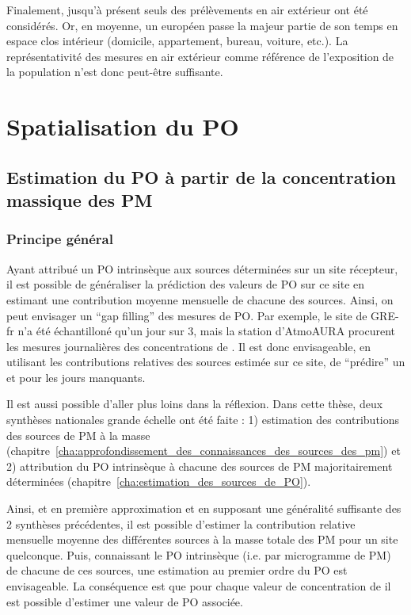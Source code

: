 Finalement, jusqu'à présent seuls des prélèvements en air extérieur ont été considérés. Or, en moyenne, un européen passe la majeur partie de son temps en espace clos intérieur (domicile,
appartement, bureau, voiture, etc.).  La représentativité des mesures en air extérieur
comme référence de l'exposition de la population n'est donc peut-être suffisante.

\section{Spatialisation du PO}

\subsection{Estimation du PO à partir de la concentration massique des PM}

\subsubsection{Principe général}

Ayant attribué un PO intrinsèque aux sources déterminées sur un site récepteur, il est
possible de généraliser la prédiction des valeurs de PO sur ce site en estimant une
contribution moyenne mensuelle de chacune des sources. Ainsi, on peut envisager un ``gap
filling'' des mesures de PO. Par exemple, le site de GRE-fr n'a été échantilloné qu'un
jour sur 3, mais la station d'AtmoAURA procurent les mesures journalières des
concentrations de \PMdix. Il est donc envisageable, en utilisant les contributions
relatives des sources estimée sur ce site, de ``prédire'' un \POAAv{} et \PODTTv{} pour
les jours manquants.

Il est aussi possible d'aller plus loins dans la réflexion. Dans cette thèse, deux
synthèses nationales grande échelle ont été faite : 1) estimation des contributions des
sources de PM à la masse \autocite{weberComparison2019}
(chapitre~\ref{cha:approfondissement_des_connaissances_des_sources_des_pm}) et 2) attribution du PO intrinsèque à
chacune des sources de PM majoritairement déterminées \autocite{weberSourceinprep.}
(chapitre~\ref{cha:estimation_des_sources_de_PO}).

Ainsi, et en première approximation et en supposant une généralité suffisante des 2
synthèses précédentes, il est possible d'estimer la contribution relative mensuelle
moyenne des différentes sources à la masse totale des PM pour un site quelconque.  Puis,
connaissant le PO intrinsèque (i.e. par microgramme de PM) de chacune de ces sources, une
estimation au premier ordre du PO est envisageable.  La conséquence est que pour chaque
valeur de concentration de \PMdix{} il est possible d'estimer une valeur de PO associée.

